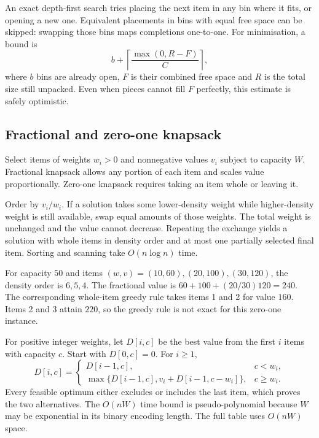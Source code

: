\documentclass[12pt,a4paper]{article}
\begin{document}
An exact depth-first search tries placing the next item in any bin where it fits, or opening a new one. Equivalent placements in bins with equal free space can be skipped: swapping those bins maps completions one-to-one. For minimisation, a bound is
\[
b+\left\lceil \frac{\max(0,R-F)}{C}\right\rceil,
\]
where $b$ bins are already open, $F$ is their combined free space and $R$ is the total size still unpacked. Even when pieces cannot fill $F$ perfectly, this estimate is safely optimistic.

\subsection{Fractional and zero-one knapsack}
\begin{tcolorbox}[defbox, title={Knapsack variants}]
Select items of weights $w_i>0$ and nonnegative values $v_i$ subject to capacity $W$. Fractional knapsack allows any portion of each item and scales value proportionally. Zero-one knapsack requires taking an item whole or leaving it.
\end{tcolorbox}

\begin{tcolorbox}[examplebox, title={Why density is exact for fractional knapsack}]
Order by $v_i/w_i$. If a solution takes some lower-density weight while higher-density weight is still available, swap equal amounts of those weights. The total weight is unchanged and the value cannot decrease. Repeating the exchange yields a solution with whole items in density order and at most one partially selected final item. Sorting and scanning take $O(n\log n)$ time.
\end{tcolorbox}

For capacity $50$ and items $(w,v)=(10,60),(20,100),(30,120)$, the density order is $6,5,4$. The fractional value is $60+100+(20/30)120=240$. The corresponding whole-item greedy rule takes items 1 and 2 for value $160$. Items 2 and 3 attain $220$, so the greedy rule is not exact for this zero-one instance.
\begin{tcolorbox}[formulabox, title={Zero-one recurrence and complexity}]
For positive integer weights, let $D[i,c]$ be the best value from the first $i$ items with capacity $c$. Start with $D[0,c]=0$. For $i\ge1$,
\[
D[i,c]=
\begin{cases}
D[i-1,c], & c<w_i,\\
\max\{D[i-1,c],v_i+D[i-1,c-w_i]\}, & c\ge w_i .
\end{cases}
\]
Every feasible optimum either excludes or includes the last item, which proves the two alternatives. The $O(nW)$ time bound is pseudo-polynomial because $W$ may be exponential in its binary encoding length. The full table uses $O(nW)$ space.
\end{tcolorbox}
\end{document}
